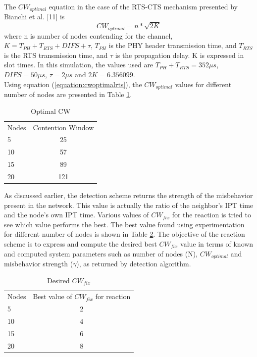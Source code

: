 \documentclass[12pt,letterpaper,english]{article}
\begin{document}
The $CW_{optimal}$ equation in the case of the RTS-CTS mechanism presented by Bianchi et al. 
[11] 
is
\begin{equation}
\label{equation:cwoptimalrts}
CW_{optimal} = n * \sqrt{2K}
\end{equation}
where n is number of nodes contending for the channel, $K = T_{PH} + T_{RTS} + DIFS + \tau$, $T_{PH}$ is the PHY header transmission time, and $T_{RTS}$ is the RTS transmission time, and $\tau$ is the propagation delay. K is expressed in slot times. In this simulation, the values used are 
$T_{PH} + T_{RTS} = 352 \mu s$, 
$DIFS = 50 \mu s$, 
$\tau = 2 \mu s$ and  
$2K = 6.356099$.
\\
Using equation (\ref{equation:cwoptimalrts}), the $CW_{optimal}$ values for different number of nodes are presented in Table \ref{table:optimalcw}.
\begin{table}[H]
\caption{Optimal CW}
\label{table:optimalcw}
\begin{center}
\begin{tabular}{l c}
\hline
\hline
Nodes & Contention Window\\
5 & 25\\
10 & 57\\
15 & 89\\
20 & 121\\
\hline
\end{tabular}
\end{center}
\end{table}
As discussed earlier, the detection scheme returns the strength of the misbehavior present in the network. This value is actually the ratio of the neighbor's IPT time and the node's own IPT time. 
Various values of $CW_{fix}$ for the reaction is tried to see which value performs the best. The best value found using experimentation for different number of nodes is shown in Table \ref{table:desiredcwfix}.
The objective of the reaction scheme is to express and compute the desired best $CW_{fix}$ value in terms of known and computed system parameters such as number of nodes (N), $CW_{optimal}$ and misbehavior strength ($\gamma$), as returned by detection algorithm.
\begin{table}[H]
\caption{Desired $CW_{fix}$}
\label{table:desiredcwfix}
\begin{center}
\begin{tabular}{l c}
\hline
\hline
Nodes & Best value of $CW_{fix}$ for reaction\\
5 & 2\\
10 & 4\\
15 & 6\\
20 & 8\\
\hline
\end{tabular}
\end{center}
\end{table}
\end{document}
